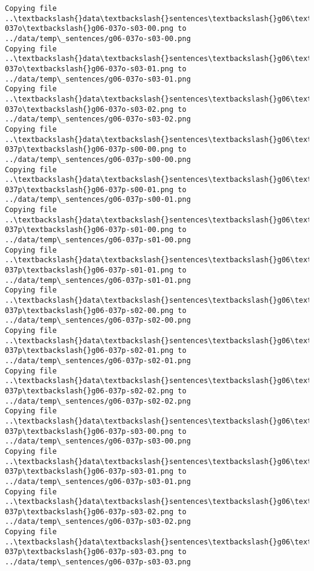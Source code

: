 \documentclass[11pt]{article}
\begin{document}
\begin{Verbatim}[commandchars=\\\{\}]
Copying file ..\textbackslash{}data\textbackslash{}sentences\textbackslash{}g06\textbackslash{}g06-037o\textbackslash{}g06-037o-s03-00.png to
../data/temp\_sentences/g06-037o-s03-00.png
Copying file ..\textbackslash{}data\textbackslash{}sentences\textbackslash{}g06\textbackslash{}g06-037o\textbackslash{}g06-037o-s03-01.png to
../data/temp\_sentences/g06-037o-s03-01.png
Copying file ..\textbackslash{}data\textbackslash{}sentences\textbackslash{}g06\textbackslash{}g06-037o\textbackslash{}g06-037o-s03-02.png to
../data/temp\_sentences/g06-037o-s03-02.png
Copying file ..\textbackslash{}data\textbackslash{}sentences\textbackslash{}g06\textbackslash{}g06-037p\textbackslash{}g06-037p-s00-00.png to
../data/temp\_sentences/g06-037p-s00-00.png
Copying file ..\textbackslash{}data\textbackslash{}sentences\textbackslash{}g06\textbackslash{}g06-037p\textbackslash{}g06-037p-s00-01.png to
../data/temp\_sentences/g06-037p-s00-01.png
Copying file ..\textbackslash{}data\textbackslash{}sentences\textbackslash{}g06\textbackslash{}g06-037p\textbackslash{}g06-037p-s01-00.png to
../data/temp\_sentences/g06-037p-s01-00.png
Copying file ..\textbackslash{}data\textbackslash{}sentences\textbackslash{}g06\textbackslash{}g06-037p\textbackslash{}g06-037p-s01-01.png to
../data/temp\_sentences/g06-037p-s01-01.png
Copying file ..\textbackslash{}data\textbackslash{}sentences\textbackslash{}g06\textbackslash{}g06-037p\textbackslash{}g06-037p-s02-00.png to
../data/temp\_sentences/g06-037p-s02-00.png
Copying file ..\textbackslash{}data\textbackslash{}sentences\textbackslash{}g06\textbackslash{}g06-037p\textbackslash{}g06-037p-s02-01.png to
../data/temp\_sentences/g06-037p-s02-01.png
Copying file ..\textbackslash{}data\textbackslash{}sentences\textbackslash{}g06\textbackslash{}g06-037p\textbackslash{}g06-037p-s02-02.png to
../data/temp\_sentences/g06-037p-s02-02.png
Copying file ..\textbackslash{}data\textbackslash{}sentences\textbackslash{}g06\textbackslash{}g06-037p\textbackslash{}g06-037p-s03-00.png to
../data/temp\_sentences/g06-037p-s03-00.png
Copying file ..\textbackslash{}data\textbackslash{}sentences\textbackslash{}g06\textbackslash{}g06-037p\textbackslash{}g06-037p-s03-01.png to
../data/temp\_sentences/g06-037p-s03-01.png
Copying file ..\textbackslash{}data\textbackslash{}sentences\textbackslash{}g06\textbackslash{}g06-037p\textbackslash{}g06-037p-s03-02.png to
../data/temp\_sentences/g06-037p-s03-02.png
Copying file ..\textbackslash{}data\textbackslash{}sentences\textbackslash{}g06\textbackslash{}g06-037p\textbackslash{}g06-037p-s03-03.png to
../data/temp\_sentences/g06-037p-s03-03.png

\end{Verbatim}
\end{document}
